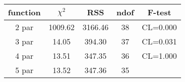 \begin{tabular}{c|c|c|c|c}
function & $\chi^2$ & RSS & ndof & F-test \\
\hline
2 par & 1009.62 & 3166.46 & 38 & CL=0.000 \\
3 par & 14.05 & 394.30 & 37 & CL=0.031 \\
4 par & 13.51 & 347.35 & 36 & CL=1.000 \\
5 par & 13.52 & 347.36 & 35 & \\
\hline
\end{tabular}